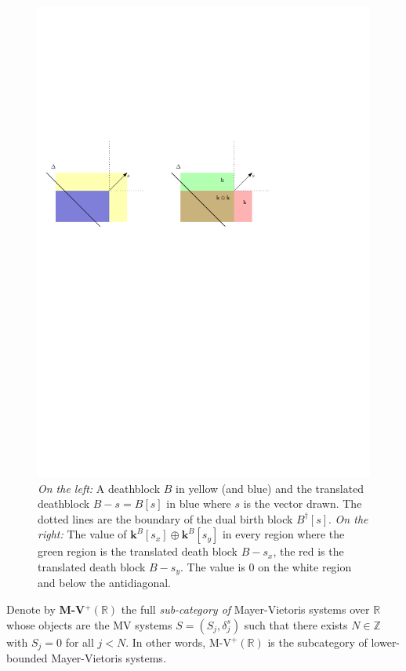 \documentclass[a4paper, english, 11pt]{article}
\newcommand{\kk}[0]{\textbf{k}}
\newcommand{\0}{\vec{0}}
\newcommand{\R}[0]{\mathbb{R}}
\newcommand{\Z}[0]{\mathbb{Z}}
\begin{document}
\begin{figure}
 \begin{center}
  \includegraphics{TranslateofBlocks.pdf}
  \caption{\emph{On the left:} A deathblock $B$ in yellow (and blue) and the translated deathblock $B-s=B[s]$ in blue where $s$ is the vector drawn. The dotted lines are the boundary of the dual birth block $B^{\dagger}[s]$. 
    \emph{On the right:} The  value of $\kk^B[s_x]\oplus \kk^B[s_y]$ in every region where the green region is the  translated death block $B-s_x$, the red is the translated death block $B-s_y$. The value is $0$ on the white region and below the antidiagonal.  }
  \label{fig:translationblocks}
 \end{center}
\end{figure}


Denote by \textbf{M-V$^+ (\R)$} the full \emph{sub-category of} Mayer-Vietoris systems over $\R$ whose objects are the MV systems $S =(S_j,\delta_j^s)$ such that there exists $N\in\Z$ with $S_j = 0$ for all $j< N$. In other words, M-V$^+ (\R)$ is the subcategory of lower-bounded Mayer-Vietoris systems.
\end{document}
